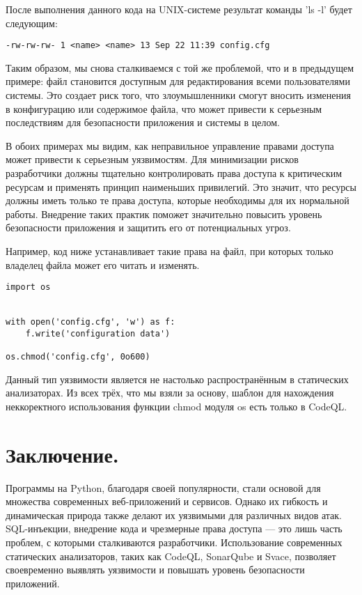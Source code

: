\documentclass[a4paper,12pt]{article} %
\begin{document}
				\par После выполнения данного кода на UNIX-системе результат команды 'ls -l' будет следующим:

				\begin{lstlisting}
-rw-rw-rw- 1 <name> <name> 13 Sep 22 11:39 config.cfg
                \end{lstlisting}

				\par Таким образом, мы снова сталкиваемся с той же проблемой, что и в предыдущем примере: файл становится доступным для редактирования всеми пользователями системы. Это создает риск того, что злоумышленники смогут вносить изменения в конфигурацию или содержимое файла, что может привести к серьезным последствиям для безопасности приложения и системы в целом.

			\par В обоих примерах мы видим, как неправильное управление правами доступа может привести к серьезным уязвимостям. Для минимизации рисков разработчики должны тщательно контролировать права доступа к критическим ресурсам и применять принцип наименьших привилегий. Это значит, что ресурсы должны иметь только те права доступа, которые необходимы для их нормальной работы. Внедрение таких практик поможет значительно повысить уровень безопасности приложения и защитить его от потенциальных угроз.

			\par Например, код ниже устанавливает такие права на файл, при которых только владелец файла может его читать и изменять.

			\begin{lstlisting}[style=pythonstyle]
import os


with open('config.cfg', 'w') as f:
    f.write('configuration data')

os.chmod('config.cfg', 0o600)
			\end{lstlisting}

			\par Данный тип уязвимости является не настолько распространённым в статических анализаторах. Из всех трёх, что мы взяли за основу, шаблон для нахождения неккоректного использования функции chmod модуля os есть только в CodeQL.

	\section{Заключение.}
		Программы на Python, благодаря своей популярности, стали основой для множества современных веб-приложений и сервисов. Однако их гибкость и динамическая природа также делают их уязвимыми для различных видов атак. SQL-инъекции, внедрение кода и чрезмерные права доступа — это лишь часть проблем, с которыми сталкиваются разработчики. Использование современных статических анализаторов, таких как CodeQL, SonarQube и Svace, позволяет своевременно выявлять уязвимости и повышать уровень безопасности приложений.
\end{document}
